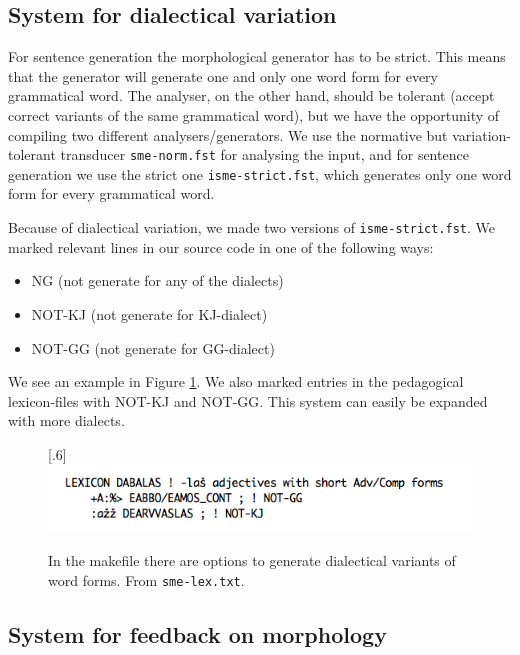 \documentclass[a4paper,12pt]{article}
\begin{document}
\subsection{System for dialectical variation}\label{dialect}
For sentence generation the morphological generator has to be strict. This means that the generator will generate one and only one word form for every grammatical word. The analyser, on the other hand, should be tolerant (accept correct variants of the same grammatical word), but we have the opportunity of compiling two different analysers/generators. We use the normative but variation-tolerant transducer \texttt{sme-norm.fst} for analysing the input, and for sentence generation we use the strict one \texttt{isme-strict.fst}, which generates only one word form for every grammatical word.

Because of dialectical variation, we made two versions of \texttt{isme-strict.fst}. We marked relevant lines in our source code in one of the following ways:
\begin {itemize}
\item NG (not generate for any of the dialects)
\item NOT-KJ (not generate for KJ-dialect) 
\item NOT-GG (not generate for GG-dialect)  
\end {itemize}

We see an example in Figure \ref{smelex}. We also marked entries in the pedagogical lexicon-files with NOT-KJ and NOT-GG. This system can easily be expanded with more dialects.


\begin{figure}[htbp]
\begin{center}
\scalebox{.6}[.6]{\includegraphics{presentation/img/smelex.png}}\\
\caption{In the makefile there are options to generate dialectical variants of word forms. From \texttt{sme-lex.txt}.}
\label{smelex}
\end{center}
\end{figure}

\newpage
\subsection{System for feedback on morphology}
\end{document}
